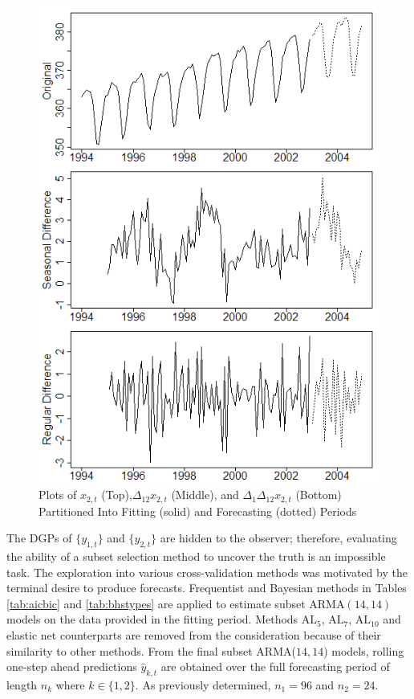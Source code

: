 \begin{figure}[htbp]
	\centering
	\caption{Plots of $x_{2,t}$ (Top),$\Delta_{12}x_{2,t}$ (Middle), and $\Delta_1\Delta_{12}x_{2,t}$ (Bottom) Partitioned Into Fitting (solid) and Forecasting (dotted) Periods}
	\label{fig:co2plots2}
	\includegraphics[scale=0.55]{co2plots2}
\end{figure}

The DGPs of $\{y_{1,t}\}$ and $\{y_{2,t}\}$ are hidden to the observer; therefore, evaluating the ability of a subset selection method to uncover the truth is an impossible task. The exploration into various cross-validation methods was motivated by the terminal desire to produce forecasts. Frequentist and Bayesian methods in Tables \ref{tab:aicbic} and \ref{tab:bhstypes} are applied to estimate subset ARMA$(14,14)$ models on the data provided in the fitting period. Methods $\textrm{AL}_5$, $\textrm{AL}_7$, $\textrm{AL}_{10}$ and elastic net counterparts are removed from the consideration because of their similarity to other methods. From the final subset ARMA($14,14$) models, rolling one-step ahead predictions $\hat{y}_{k,t}$ are obtained over the full forecasting period of length $n_k$ where $k\in\{1,2\}$.  As previously determined, $n_1=96$ and $n_2=24$.  

